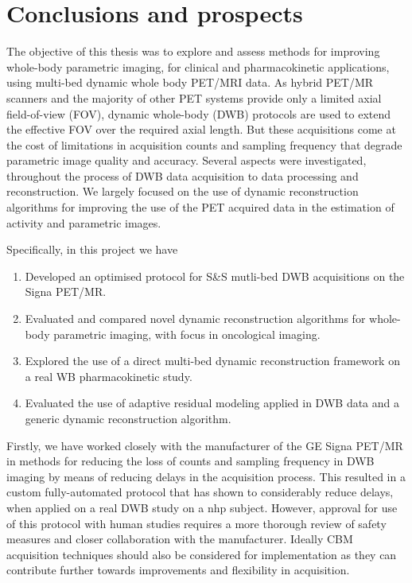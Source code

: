 \chapter*{Conclusions and prospects}
The objective of this thesis was to explore and assess methods for improving whole-body parametric imaging, for clinical and pharmacokinetic applications, using multi-bed dynamic whole body PET/MRI data.
As hybrid PET/MR scanners and the majority of other PET systems provide only a limited axial field-of-view (FOV), dynamic whole-body (DWB) protocols are used to extend the effective FOV over the required axial length. But these acquisitions come at the cost of limitations in acquisition counts and sampling frequency that degrade parametric image quality and accuracy.
Several aspects were investigated, throughout the process of DWB data acquisition to data processing and reconstruction. We largely focused on the use of dynamic reconstruction algorithms for improving the use of the PET acquired data in the estimation of activity and parametric images.

Specifically, in this project we have
\begin{enumerate}
\item Developed an optimised protocol for S\&S mutli-bed DWB acquisitions on the Signa PET/MR.
\item Evaluated and compared novel dynamic reconstruction algorithms for whole-body parametric imaging, with focus in oncological imaging.
\item Explored the use of a direct multi-bed dynamic reconstruction framework on a real WB pharmacokinetic study.
\item Evaluated the use of adaptive residual modeling applied in DWB data and a generic dynamic reconstruction algorithm.
\end{enumerate}

Firstly, we have worked closely with the manufacturer of the GE Signa PET/MR in methods for reducing the loss of counts and sampling frequency in DWB imaging by means of reducing delays in the acquisition process. This resulted in a custom fully-automated protocol that has shown to considerably reduce delays, when applied on a real DWB study on a \gls{nhp} subject. However, approval for use of this protocol with human studies requires a more thorough review of safety measures and closer collaboration with the manufacturer. Ideally CBM acquisition techniques should also be considered for implementation as they can contribute further towards improvements and flexibility in acquisition. 

